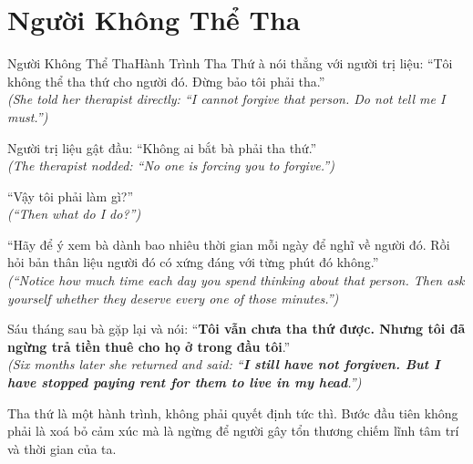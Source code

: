\section{Người Không Thể Tha}
\begin{truyen}{Người Không Thể Tha}{Hành Trình Tha Thứ}
à nói thẳng với người trị liệu: ``Tôi không thể tha thứ cho người đó. Đừng bảo tôi phải tha.''\\
\textit{(She told her therapist directly: ``I cannot forgive that person. Do not tell me I must.'')}

Người trị liệu gật đầu: ``Không ai bắt bà phải tha thứ.''\\
\textit{(The therapist nodded: ``No one is forcing you to forgive.'')}

``Vậy tôi phải làm gì?''\\
\textit{(``Then what do I do?'')}

``Hãy để ý xem bà dành bao nhiêu thời gian mỗi ngày để nghĩ về người đó. Rồi hỏi bản thân liệu người đó có xứng đáng với từng phút đó không.''\\
\textit{(``Notice how much time each day you spend thinking about that person. Then ask yourself whether they deserve every one of those minutes.'')}

Sáu tháng sau bà gặp lại và nói: ``\textbf{Tôi vẫn chưa tha thứ được. Nhưng tôi đã ngừng trả tiền thuê cho họ ở trong đầu tôi}.''\\
\textit{(Six months later she returned and said: ``\textbf{I still have not forgiven. But I have stopped paying rent for them to live in my head}.'')}
\end{truyen}
\begin{baihoc}
  Tha thứ là một hành trình, không phải quyết định tức thì. Bước đầu tiên không phải là xoá bỏ cảm xúc mà là ngừng để người gây tổn thương chiếm lĩnh tâm trí và thời gian của ta.
\end{baihoc}

